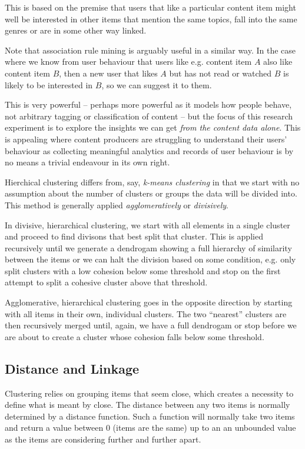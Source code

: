This is based on the premise that users that like a particular
content item might well be interested in other items that mention
the same topics, fall into the same genres or are in some other
way linked.

Note that association rule mining is arguably useful in a similar way.
In the case where we know from user behaviour that users like e.g.
content item $A$ also like content item $B$, then a new user that
likes $A$ but has not read or watched $B$ is likely to be interested
in $B$, so we can suggest it to them.

This is very powerful -- perhaps more powerful as it models how
people behave, not arbitrary tagging or classification of content --
but the focus of this research experiment is to explore the insights
we can get \emph{from the content data alone}. This is appealing
where content producers are struggling to understand their users'
behaviour as collecting meaningful analytics and records of user
behaviour is by no means a trivial endeavour in its own right.

Hierchical clustering differs from, say,
\emph{k-means clustering}\cite{witten2005data} in that
we start with no assumption about the number of clusters or groups
the data will be divided into. This method is generally applied
\emph{agglomeratively} or \emph{divisively}.

In divisive, hierarchical clustering, we start with all elements in
a single cluster and proceed to find divisons that best split that
cluster. This is applied recursively until we generate a
dendrogam\cite{witten2005data} showing a full hierarchy of similarity
between the items or we can halt the division based on some condition,
e.g. only split clusters with a low cohesion below some threshold
and stop on the first attempt to split a cohesive cluster above
that threshold.

Agglomerative, hierarchical clustering goes in the opposite direction
by starting with all items in their own, individual clusters.
The two ``nearest'' clusters are then recursively merged until, again,
we have a full dendrogam or stop before we are about to create a
cluster whose cohesion falls below some threshold.

\subsection{Distance and Linkage}

Clustering relies on grouping items that seem close, which creates
a necessity to define what is meant by close. The distance between
any two items is normally determined by a distance
function.\cite{witten2005data} Such a function will normally take
two items and return a value between 0 (items are the same) up to an
an unbounded value as the items are considering further and further
apart.


